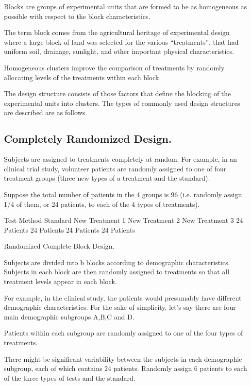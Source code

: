 \documentclass[a4paper,12pt]{article}
\begin{document}
Blocks are groups of experimental units that are formed to be as homogeneous as possible with respect to the block characteristics. 

The term block comes from the agricultural heritage of experimental design where a large block of land was selected for the various “treatments”, that had uniform soil, drainage, sunlight, and other important physical characteristics.

Homogeneous clusters improve the comparison of treatments by randomly allocating levels of the treatments within each block.

The design structure consists of those factors that define the blocking of the experimental units into clusters. The types of commonly used design structures are described are as follows.

\subsection{Completely Randomized Design.}

Subjects are assigned to treatments completely at random.
For example, in an clinical trial study, volunteer patients are randomly assigned to one of four treatment groups (three new types of a treatment and the standard). 

Suppose the total number of patients in the 4 groups is 96 (i.e. randomly assign 1/4 of them, or 24 patients, to each of the 4 types of treatments).


Test Method
Standard	New Treatment 1	New Treatment 2	New Treatment 3
24 Patients	24 Patients	24 Patients	24 Patients

Randomized Complete Block Design. 

Subjects are divided into b blocks according to demographic characteristics. Subjects in each block are then randomly assigned to treatments so that all treatment levels appear in each block. 

For example, in the clinical study, the patients would presumably have different demographic characteristics. For the sake of simplicity, let’s say there are four main demographic subgroups A,B,C and D. 

Patients within each subgroup are randomly assigned to one of the four types of treatments. 

There might be significant variability between the subjects in each demographic subgroup, each of which contains 24 patients. Randomly assign 6 patients to each of the three types of tests and the standard. 
\end{document}
